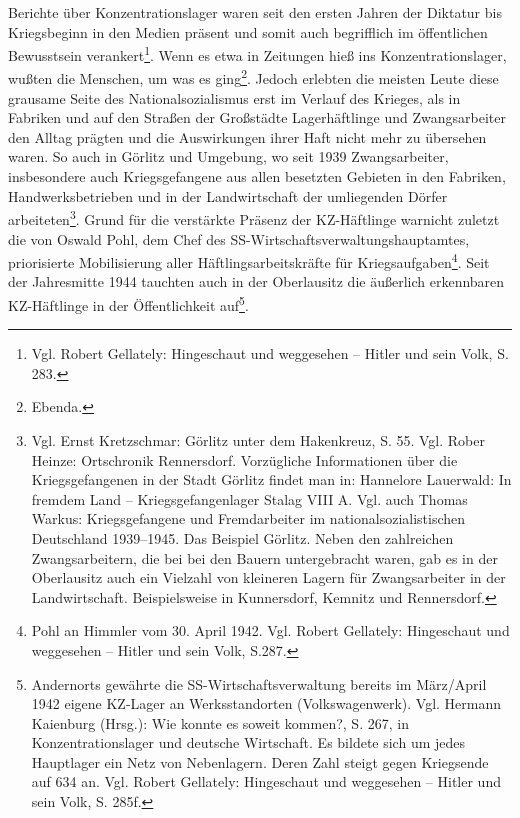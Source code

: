 \documentclass[a4paper,12pt,ngerman,
]{nisebook}
\begin{document}
Berichte über Konzentrationslager waren seit den ersten Jahren der Diktatur bis Kriegsbeginn in den Medien präsent und somit auch begrifflich im öffentlichen Bewusstsein verankert\footnote{Vgl. Robert Gellately: Hingeschaut und weggesehen -- Hitler und sein Volk, S. 283.}. Wenn es etwa in Zeitungen hieß \glqq ins Konzentrationslager\grqq, wußten die Menschen, um was es ging\footnote{Ebenda.}. Jedoch erlebten die meisten Leute diese grausame Seite des Nationalsozialismus erst im Verlauf des Krieges, als in Fabriken und auf den Straßen der Großstädte Lagerhäftlinge und Zwangsarbeiter den Alltag prägten und die Auswirkungen ihrer Haft nicht mehr zu übersehen waren. So auch in Görlitz und Umgebung, wo seit 1939 Zwangsarbeiter, insbesondere auch Kriegsgefangene aus allen besetzten Gebieten in den Fabriken, Handwerksbetrieben und in der Landwirtschaft der umliegenden Dörfer arbeiteten\footnote{Vgl. Ernst Kretzschmar: Görlitz unter dem Hakenkreuz, S. 55. Vgl. Rober Heinze: Ortschronik Rennersdorf. Vorzügliche Informationen über die Kriegsgefangenen in der Stadt Görlitz findet man in: Hannelore Lauerwald: In fremdem Land -- Kriegsgefangenlager Stalag VIII A. Vgl. auch Thomas Warkus: Kriegsgefangene und Fremdarbeiter im nationalsozialistischen Deutschland 1939--1945. Das Beispiel Görlitz. Neben den zahlreichen Zwangsarbeitern, die bei bei den Bauern untergebracht waren, gab es in der Oberlausitz auch ein Vielzahl von kleineren Lagern für Zwangsarbeiter in der Landwirtschaft. Beispielsweise in Kunnersdorf, Kemnitz und Rennersdorf.}. Grund für die verstärkte Präsenz der KZ-Häftlinge war\linebreak\newpage nicht zuletzt die von Oswald Pohl, dem Chef des SS-Wirtschaftsverwaltungshauptamtes, priorisierte Mobilisierung aller Häftlingsarbeitskräfte für Kriegsaufgaben\footnote{Pohl an Himmler vom 30. April 1942. Vgl. Robert Gellately: Hingeschaut und weggesehen -- Hitler und sein Volk, S.287.}.
Seit der Jahresmitte 1944 tauchten auch in der Oberlausitz die äußerlich erkennbaren KZ-Häftlinge in der Öffentlichkeit auf\footnote{Andernorts gewährte die SS-Wirtschaftsverwaltung bereits im März/April 1942 eigene KZ-Lager an Werksstandorten (Volkswagenwerk). Vgl. Hermann Kaienburg (Hrsg.): Wie konnte es soweit kommen?, S. 267, in Konzentrationslager und deutsche Wirtschaft. Es bildete sich um jedes Hauptlager ein Netz von Nebenlagern. Deren Zahl steigt gegen Kriegsende auf 634 an. Vgl. Robert Gellately: Hingeschaut und weggesehen -- Hitler und sein Volk, S. 285f.}.\newline
\end{document}
